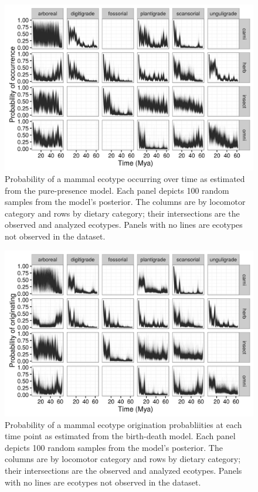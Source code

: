 \documentclass[12pt,letterpaper]{article}
\begin{document}
\begin{figure}[ht]
  \centering
  \includegraphics[width=\textwidth,height=0.5\textheight,keepaspectratio=true]{figure/ecotype_occurrence}
  \caption[Ecotype occurrence probability estimated from the pure-presence model]{Probability of a mammal ecotype occurring over time as estimated from the pure-presence model. Each panel depicts 100 random samples from the model's posterior. The columns are by locomotor category and rows by dietary category; their intersections are the observed and analyzed ecotypes. Panels with no lines are ecotypes not observed in the dataset.}
  \label{fig:eco_occur}
\end{figure}

\begin{figure}[ht]
  \centering
  \includegraphics[width=\textwidth,height=0.5\textheight,keepaspectratio=true]{figure/ecotype_origin_bd}
  \caption[Ecotype origination probability estimated from the birth-death model]{Probability of a mammal ecotype origination probabliities at each time point as estimated from the birth-death model. Each panel depicts 100 random samples from the model's posterior. The columns are by locomotor category and rows by dietary category; their intersections are the observed and analyzed ecotypes. Panels with no lines are ecotypes not observed in the dataset.}
  \label{fig:eco_origin}
\end{figure}
\end{document}
